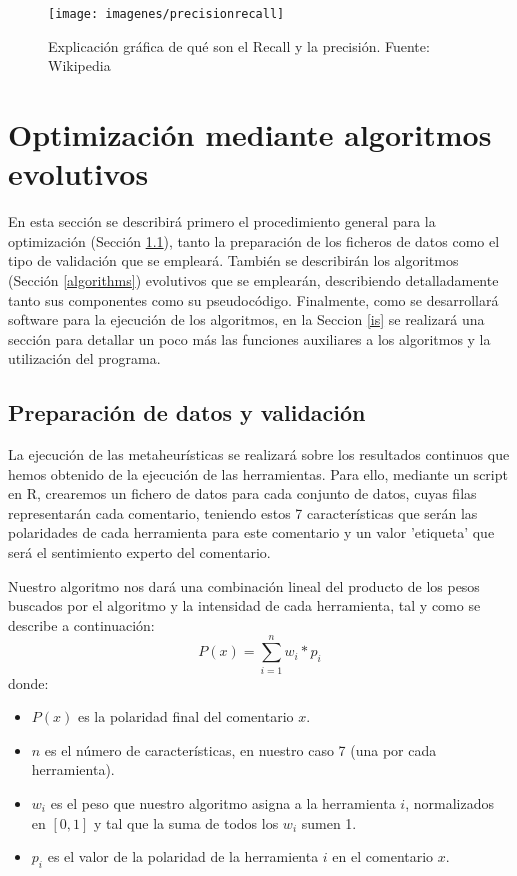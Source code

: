\begin{figure} [H]
	\centering
	\texttt{[image: imagenes/precisionrecall]}
	\caption{Explicación gráfica de qué son el Recall y la precisión. Fuente: Wikipedia}
	\label{fig:precisionrecall}
\end{figure}


\section{Optimización mediante algoritmos evolutivos} \label{evolutionpreparation}
En esta sección se describirá primero el procedimiento general para la optimización (Sección \ref{preparacionevo}), tanto la preparación de los ficheros de datos como el tipo de validación que se empleará. También se describirán los algoritmos (Sección \ref{algorithms}) evolutivos que se emplearán, describiendo detalladamente tanto sus componentes como su pseudocódigo. Finalmente, como se desarrollará software para la ejecución de los algoritmos, en la Seccion \ref{is} se realizará una sección para detallar un poco más las funciones auxiliares a los algoritmos y la utilización del programa.
\subsection{Preparación de datos y validación} \label{preparacionevo}
La ejecución de las metaheurísticas se realizará sobre los resultados continuos que hemos obtenido de la ejecución de las herramientas. Para ello, mediante un script en R, crearemos un fichero de datos para cada conjunto de datos, cuyas filas representarán cada comentario, teniendo estos 7 características que serán las polaridades de cada herramienta para este comentario y un valor 'etiqueta' que será el sentimiento experto del comentario.

Nuestro algoritmo nos dará una combinación lineal del producto de los pesos buscados por el algoritmo y la intensidad de cada herramienta, tal y como se describe a continuación:
$$P(x) = \sum_{i=1}^{n}w_i*p_i$$
donde:
\begin{itemize}
	\item $P(x)$ es la polaridad final del comentario $x$.
	\item $n$ es el número de características, en nuestro caso 7 (una por cada herramienta).
	\item $w_i$ es el peso que nuestro algoritmo asigna a la herramienta $i$, normalizados en $[0,1]$ y tal que la suma de todos los $w_i$ sumen 1.
	\item $p_i$ es el valor de la polaridad de la herramienta $i$ en el comentario $x$.
\end{itemize}

